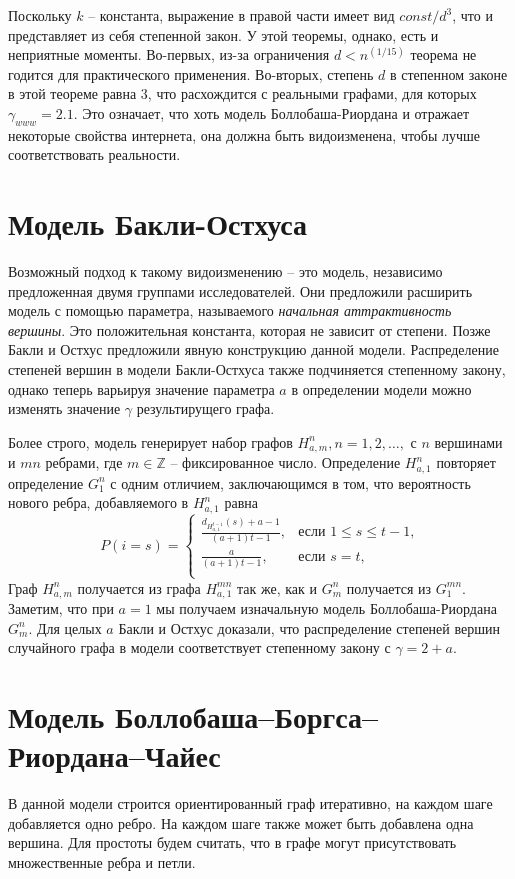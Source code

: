 \documentclass[14pt]{extreport}
\begin{document}
Поскольку $k$ -- константа, выражение в правой части имеет вид $const / d^3$, что и представляет из себя степенной закон.
У этой теоремы, однако, есть и неприятные моменты. Во-первых, из-за ограничения $d < n^(1/15)$ теорема не годится для практического применения. Во-вторых, степень $d$ в степенном законе в этой теореме равна 3, что расхождится с реальными графами, для которых $\gamma_{www}=2.1$. Это означает, что хоть модель Боллобаша-Риордана и отражает некоторые свойства интернета, она должна быть видоизменена, чтобы лучше соответствовать реальности.

\section{Модель Бакли-Остхуса}
Возможный подход к такому видоизменению  -- это модель, независимо предложенная двумя группами исследователей. Они предложили расширить модель с помощью параметра, называемого {\it начальная аттрактивность вершины}. Это положительная константа, которая не зависит от степени. Позже Бакли и Остхус предложили явную конструкцию данной модели. Распределение степеней вершин в модели Бакли-Остхуса также подчиняется степенному закону, однако теперь варьируя значение параметра $a$ в определении модели можно изменять значение $\gamma$ результирущего графа.

Более строго, модель генерирует набор графов $H_{a, m}^n, n=1, 2,\dots,$ с $n$ вершинами и $mn$ ребрами, где $m \in \mathbb{Z}$ -- фиксированное число. Определение $H_{a, 1}^n$ повторяет определение $G_1^n$ с одним отличием, заключающимся в том, что вероятность нового ребра, добавляемого в $H_{a, 1}^n$ равна
$$  
P(i=s) =
\begin{cases}  
  \frac{d_{H_{a, 1}^{t-1}}(s)+a-1}{(a+1)t-1},&\text{если $1 \le s \le t-1$,}\\
  \frac{a}{(a+1)t-1},&\text{если $s=t$,}\\
\end{cases}
$$  
Граф $H_{a, m}^n$ получается из графа $H_{a, 1}^{mn}$ так же, как и $G_m^n$ получается из $G_1^{mn}$. Заметим, что при $a=1$ мы получаем изначальную модель Боллобаша-Риордана $G_m^n$. Для целых $a$ Бакли и Остхус доказали, что распределение степеней вершин случайного графа в модели соответствует степенному закону с $\gamma = 2 + a$.
 
\section{Модель Боллобаша–Боргса–Риордана–Чайес}
В данной модели строится ориентированный граф итеративно, на каждом шаге добавляется одно ребро. На каждом шаге также может быть добавлена одна вершина. Для простоты будем считать, что в графе могут присутствовать множественные ребра и петли.
\end{document}
